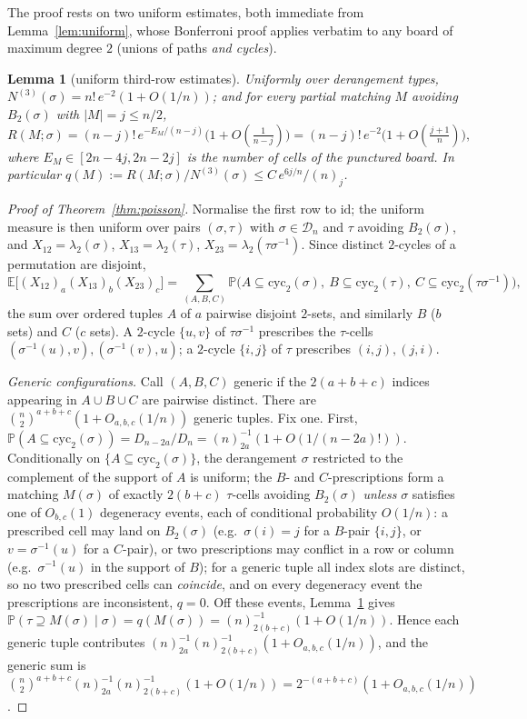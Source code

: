 \documentclass[11pt]{article}
\newtheorem{lemma}[theorem]{Lemma}
\theoremstyle{definition}
\newcommand{\E}{\mathbb{E}}
\renewcommand{\Pr}{\mathbb{P}}
\newcommand{\DD}{\mathcal{D}}
\begin{document}
The proof rests on two uniform estimates, both immediate from
Lemma~\ref{lem:uniform}, whose Bonferroni proof applies verbatim to any
board of maximum degree $2$ (unions of paths \emph{and cycles}).

\begin{lemma}[uniform third-row estimates]\label{lem:thirdunif}
Uniformly over derangement types, $N^{(3)}(\sigma)=n!\,e^{-2}(1+O(1/n))$;
and for every partial matching $M$ avoiding $B_2(\sigma)$ with
$|M|=j\le n/2$,
\[
R(M;\sigma)=(n-j)!\,e^{-E_M/(n-j)}\bigl(1+O(\tfrac1{n-j})\bigr)
=(n-j)!\,e^{-2}\bigl(1+O(\tfrac{j+1}{n})\bigr),
\]
where $E_M\in[2n-4j,2n-2j]$ is the number of cells of the punctured
board.  In particular
$q(M):=R(M;\sigma)/N^{(3)}(\sigma)\le C\,e^{6j/n}/(n)_j$.
\end{lemma}

\begin{proof}[Proof of Theorem~\ref{thm:poisson}]
Normalise the first row to $\mathrm{id}$; the uniform measure is then
uniform over pairs $(\sigma,\tau)$ with $\sigma\in\DD_n$ and $\tau$
avoiding $B_2(\sigma)$, and $X_{12}=\lambda_2(\sigma)$,
$X_{13}=\lambda_2(\tau)$, $X_{23}=\lambda_2(\tau\sigma^{-1})$.  Since
distinct $2$-cycles of a permutation are disjoint,
\[
\E\bigl[(X_{12})_a(X_{13})_b(X_{23})_c\bigr]
=\sum_{(A,B,C)}\Pr\bigl(A\subseteq\mathrm{cyc}_2(\sigma),\
B\subseteq\mathrm{cyc}_2(\tau),\ C\subseteq\mathrm{cyc}_2(\tau\sigma^{-1})\bigr),
\]
the sum over ordered tuples $A$ of $a$ pairwise disjoint $2$-sets, and
similarly $B$ ($b$ sets) and $C$ ($c$ sets).  A $2$-cycle $\{u,v\}$ of
$\tau\sigma^{-1}$ prescribes the $\tau$-cells
$(\sigma^{-1}(u),v),(\sigma^{-1}(v),u)$; a $2$-cycle $\{i,j\}$ of $\tau$
prescribes $(i,j),(j,i)$.

\emph{Generic configurations.}  Call $(A,B,C)$ generic if the
$2(a+b+c)$ indices appearing in $A\cup B\cup C$ are pairwise distinct.
There are $\binom n2^{a+b+c}(1+O_{a,b,c}(1/n))$ generic tuples.  Fix one.
First, $\Pr(A\subseteq\mathrm{cyc}_2(\sigma))=D_{n-2a}/D_n
=(n)_{2a}^{-1}(1+O(1/(n-2a)!))$.  Conditionally on
$\{A\subseteq\mathrm{cyc}_2(\sigma)\}$, the derangement $\sigma$
restricted to the complement of the support of $A$ is uniform; the
$B$- and $C$-prescriptions form a matching $M(\sigma)$ of exactly
$2(b+c)$ $\tau$-cells avoiding $B_2(\sigma)$ \emph{unless} $\sigma$
satisfies one of $O_{b,c}(1)$ degeneracy events, each of conditional
probability $O(1/n)$: a prescribed cell may land on $B_2(\sigma)$
(e.g.\ $\sigma(i)=j$ for a $B$-pair $\{i,j\}$, or $v=\sigma^{-1}(u)$ for
a $C$-pair), or two prescriptions may conflict in a row or column
(e.g.\ $\sigma^{-1}(u)$ in the support of $B$); for a generic tuple all
index slots are distinct, so no two prescribed cells can \emph{coincide},
and on every degeneracy event the prescriptions are inconsistent,
$q=0$.  Off these events, Lemma~\ref{lem:thirdunif} gives
$\Pr(\tau\supseteq M(\sigma)\mid\sigma)=q(M(\sigma))
=(n)_{2(b+c)}^{-1}(1+O(1/n))$.  Hence each generic tuple contributes
$(n)_{2a}^{-1}(n)_{2(b+c)}^{-1}(1+O_{a,b,c}(1/n))$, and the generic sum
is $\binom n2^{a+b+c}(n)_{2a}^{-1}(n)_{2(b+c)}^{-1}(1+O(1/n))
=2^{-(a+b+c)}(1+O_{a,b,c}(1/n))$.


\end{proof}
\end{document}
